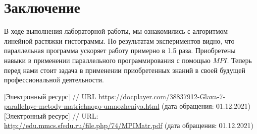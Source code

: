 \documentclass{report}
\begin{document}
\section*{Заключение}
В ходе выполнения лабораторной работы, мы ознакомились с алгоритмом линейной растяжки гистограммы. По результатам экспериментов видно, что параллельная программа ускоряет работу примерно в 1.5 раза. Приобретены навыки в применении параллельного программирования с помощью {\itshape $MPI$}. Теперь перед нами стоит задача в применении приобретенных знаний в своей будущей профессиональной деятельности.
\newpage

\begin{thebibliography}{1}
 [Электронный ресурс] // URL \url {https://docplayer.com/38837912-Glava-7-parallelnye-metody-matrichnogo-umnozheniya.html} (дата обращения: 01.12.2021)
 [Электронный ресурс] // URL: \url {http://edu.mmcs.sfedu.ru/file.php/74/MPIMatr.pdf} (дата обращения: 01.12.2021)
\end{thebibliography}
\newpage

\end{document}

